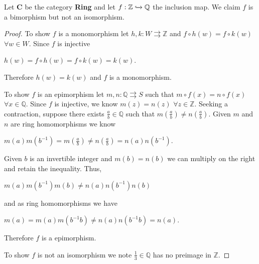 \documentclass{article}
\newcommand{\Q}{\mathbb{Q}}
\newcommand{\Z}{\mathbb{Z}}
\begin{document}
\vspace{2mm}

\noindent Let \textbf{C} be the category \textbf{Ring} and let $f:\Z \xhookrightarrow[]{} \Q$ the inclusion map.
We claim $f$ is a bimorphism but not an isomorphism.

\begin{proof}
    To show $f$ is a monomorphism let $h,k:W \rightrightarrows \Z$ and $f\circ h(w)=f \circ k (w)$ $\forall w\in W$.
    Since $f$ is injective
    \begin{center}
        $h(w)=f\circ h(w)=f\circ k(w)=k(w)$.
    \end{center}
    Therefore $h(w)=k(w)$ and $f$ is a monomorphism.
    
    To show $f$ is an epimorphism let $m,n:\Q \rightrightarrows S$ such that $m\circ f(x)=n\circ f(x)$ $\forall x\in \Q$.
    Since $f$ is injective, we know $m(z)=n(z)$ $\forall z\in\Z$.
    Seeking a contraction, suppose there exists $\frac{a}{b}\in \Q$ such that $m(\frac{a}{b})\neq n(\frac{a}{b})$.
    Given $m$ and $n$ are ring homomorphisms we know
    \begin{center}
        $m(a)m(b^{-1})=m(\frac{a}{b}) \neq n(\frac{a}{b})=n(a)n(b^{-1})$.
    \end{center}
    Given $b$ is an invertible integer and $m(b)=n(b)$ we can multiply on the right and retain the inequality.
    Thus, 
    \begin{center}
        $m(a)m(b^{-1})m(b)\neq n(a)n(b^{-1})n(b)$
    \end{center} 
    and as ring homomorphisms we have
    \begin{center}
        $m(a)=m(a)m(b^{-1}b)\neq n(a)n(b^{-1}b)=n(a)$.
    \end{center}
    Therefore $f$ is a epimorphism.
    
    To show $f$ is not an isomorphism we note $\frac{1}{3}\in \Q$ has no preimage in $\Z$.
\end{proof}
\end{document}
